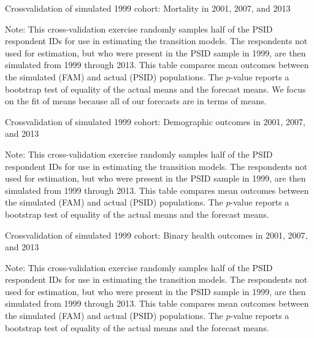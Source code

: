 \begin{table}[H]
\begin{threeparttable}
\caption{Crossvalidation of simulated 1999 cohort: Mortality in 2001, 2007, and 2013}
\label{table:crossval_unweighted}
\centering
\footnotesize

\begin{tablenotes}
\footnotesize
\item Note: This cross-validation exercise randomly samples half of the PSID respondent IDs for use in estimating the transition models. The respondents not used for estimation, but who were present in the PSID sample in 1999, are then simulated from 1999 through 2013. This table compares mean outcomes between the simulated (FAM) and actual (PSID) populations. The $p$-value reports a bootstrap test of equality of the actual means and the forecast means. We focus on the fit of means because all of our forecasts are in terms of means.
\end{tablenotes}
\end{threeparttable}
\end{table}

\begin{table}[H]
\begin{threeparttable}
\caption{Crossvalidation of simulated 1999 cohort: Demographic outcomes in 2001, 2007, and 2013}
\label{table:crossval_demog}
\centering
\footnotesize

\begin{tablenotes}
\footnotesize
\item Note: This cross-validation exercise randomly samples half of the PSID respondent IDs for use in estimating the transition models. The respondents not used for estimation, but who were present in the PSID sample in 1999, are then simulated from 1999 through 2013. This table compares mean outcomes between the simulated (FAM) and actual (PSID) populations. The $p$-value reports a bootstrap test of equality of the actual means and the forecast means.
\end{tablenotes}
\end{threeparttable}
\end{table}

\begin{table}[H]
\begin{threeparttable}
\caption{Crossvalidation of simulated 1999 cohort: Binary health outcomes in 2001, 2007, and 2013}
\label{table:crossval_binhlth}
\centering
\footnotesize

\begin{tablenotes}
\footnotesize
\item Note: This cross-validation exercise randomly samples half of the PSID respondent IDs for use in estimating the transition models. The respondents not used for estimation, but who were present in the PSID sample in 1999, are then simulated from 1999 through 2013. This table compares mean outcomes between the simulated (FAM) and actual (PSID) populations. The $p$-value reports a bootstrap test of equality of the actual means and the forecast means.
\end{tablenotes}
\end{threeparttable}
\end{table}

